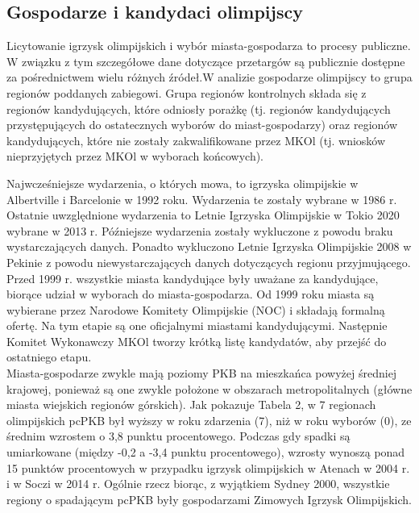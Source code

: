 \documentclass[12pt]{article}
\begin{document}
    \subsection{Gospodarze i kandydaci olimpijscy}
    Licytowanie igrzysk olimpijskich i wybór miasta-gospodarza to procesy publiczne. W związku z tym szczegółowe dane dotyczące przetargów są publicznie dostępne za pośrednictwem wielu różnych źródeł.W analizie gospodarze olimpijscy to grupa regionów poddanych zabiegowi. Grupa regionów kontrolnych składa się z regionów kandydujących, które odniosły porażkę (tj. regionów kandydujących przystępujących do ostatecznych wyborów do miast-gospodarzy) oraz regionów kandydujących, które nie zostały zakwalifikowane przez MKOl (tj. wniosków nieprzyjętych przez MKOl w wyborach końcowych).
    
    Najwcześniejsze wydarzenia, o których mowa, to igrzyska olimpijskie w Albertville i Barcelonie w 1992 roku. Wydarzenia te zostały wybrane w 1986 r. Ostatnie uwzględnione wydarzenia to Letnie Igrzyska Olimpijskie w Tokio 2020 wybrane w 2013 r. Późniejsze wydarzenia zostały wykluczone z powodu braku wystarczających danych. Ponadto wykluczono Letnie Igrzyska Olimpijskie 2008 w Pekinie z powodu niewystarczających danych dotyczących regionu przyjmującego.\\
    
    Przed 1999 r. wszystkie miasta kandydujące były uważane za kandydujące, biorące udział w wyborach do miasta-gospodarza. Od 1999 roku miasta są wybierane przez Narodowe Komitety Olimpijskie (NOC) i składają formalną ofertę. Na tym etapie są one oficjalnymi miastami kandydującymi. Następnie Komitet Wykonawczy MKOl tworzy krótką listę kandydatów, aby przejść do ostatniego etapu.\\

    Miasta-gospodarze zwykle mają poziomy PKB na mieszkańca powyżej średniej krajowej, ponieważ są one zwykle położone w obszarach metropolitalnych (główne miasta wiejskich regionów górskich). Jak pokazuje Tabela 2, w 7 regionach olimpijskich pcPKB był wyższy w roku zdarzenia (7), niż w roku wyborów (0), ze średnim wzrostem o 3,8 punktu procentowego. Podczas gdy spadki są umiarkowane (między -0,2 a -3,4 punktu procentowego), wzrosty wynoszą ponad 15 punktów procentowych w przypadku igrzysk olimpijskich w Atenach w 2004 r. i w Soczi w 2014 r. Ogólnie rzecz biorąc, z wyjątkiem Sydney 2000, wszystkie regiony o spadającym pcPKB były gospodarzami Zimowych Igrzysk Olimpijskich.\\
\end{document}

